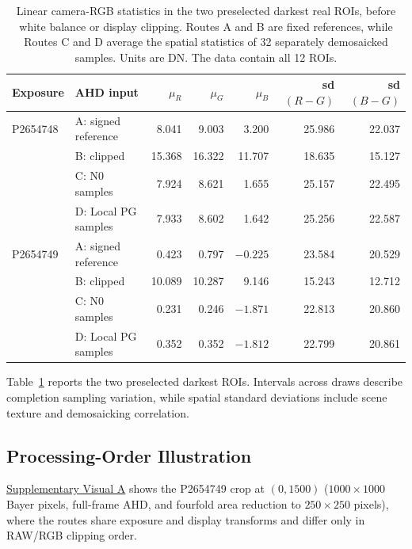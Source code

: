 \documentclass[10pt,twocolumn,journal]{IEEEtran}
\begin{document}
\begin{table}[t]
\centering
\caption{Linear camera-RGB statistics in the two preselected darkest real ROIs, before white balance or display clipping. Routes A and B are fixed references, while Routes C and D average the spatial statistics of 32 separately demosaicked samples. Units are DN. The data contain all 12 ROIs.}
\label{tab:ahd}
\begin{tabular}{@{}llrrrrr@{}}
\toprule
Exposure & AHD input & $\mu_R$ & $\mu_G$ & $\mu_B$ & sd$(R-G)$ & sd$(B-G)$\\
\midrule
P2654748 & A: signed reference & 8.041 & 9.003 & 3.200 & 25.986 & 22.037\\
& B: clipped & 15.368 & 16.322 & 11.707 & 18.635 & 15.127\\
& C: N0 samples & 7.924 & 8.621 & 1.655 & 25.157 & 22.495\\
& D: Local PG samples & 7.933 & 8.602 & 1.642 & 25.256 & 22.587\\
P2654749 & A: signed reference & 0.423 & 0.797 & $-0.225$ & 23.584 & 20.529\\
& B: clipped & 10.089 & 10.287 & 9.146 & 15.243 & 12.712\\
& C: N0 samples & 0.231 & 0.246 & $-1.871$ & 22.813 & 20.860\\
& D: Local PG samples & 0.352 & 0.352 & $-1.812$ & 22.799 & 20.861\\
\bottomrule
\end{tabular}
\end{table}

Table~\ref{tab:ahd} reports the two preselected darkest ROIs. Intervals across draws describe completion sampling variation, while spatial standard deviations include scene texture and demosaicking correlation.

\subsection{Processing-Order Illustration}
\href{visual_en.pdf}{Supplementary Visual A} shows the P2654749 crop at $(0,1500)$ ($1000\times1000$ Bayer pixels, full-frame AHD, and fourfold area reduction to $250\times250$ pixels), where the routes share exposure and display transforms and differ only in RAW/RGB clipping order.
\end{document}
